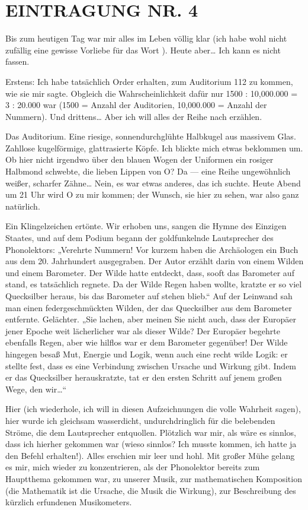 \section{EINTRAGUNG NR. 4}

Bis zum heutigen Tag war mir alles im Leben völlig klar (ich habe
wohl nicht zufällig eine gewisse Vorliebe für das Wort ). Heute
aber\ldots{} Ich kann es nicht fassen.

Erstens: Ich habe tatsächlich Order erhalten, zum Auditorium 112 zu
kommen, wie sie mir sagte. Obgleich die Wahrscheinlichkeit dafür
nur 1500 : 10,000.000 = 3 : 20.000 war (1500 = Anzahl der
Auditorien, 10,000.000 = Anzahl der Nummern). Und drittens\ldots{} Aber
ich will alles der Reihe nach erzählen.

Das Auditorium. Eine
riesige, sonnendurchglühte Halbkugel aus massivem Glas. Zahllose
kugelförmige, glattrasierte Köpfe. Ich blickte mich etwas beklommen
um. Ob hier nicht irgendwo über den blauen Wogen der Uniformen ein
rosiger Halbmond schwebte, die lieben Lippen von O? Da — eine Reihe
ungewöhnlich weißer, scharfer Zähne\ldots{} Nein, es war etwas anderes,
das ich suchte. Heute Abend um 21 Uhr wird O zu mir kommen; der
Wunsch, sie hier zu sehen, war also ganz natürlich.

Ein
Klingelzeichen ertönte. Wir erhoben uns, sangen die Hymne des
Einzigen Staates, und auf dem Podium begann der goldfunkelnde
Lautsprecher des Phonolektors: „Verehrte Nummern! Vor kurzem haben
die Archäologen ein Buch aus dem 20. Jahrhundert ausgegraben. Der
Autor erzählt darin von einem Wilden und einem Barometer. Der Wilde
hatte entdeckt, dass, sooft das Barometer auf  stand, es
tatsächlich regnete. Da der Wilde Regen haben wollte, kratzte er so
viel Quecksilber heraus, bis das Barometer auf  stehen blieb.“
Auf der Leinwand sah man einen federgeschmückten Wilden, der das
Quecksilber aus dem Barometer entfernte. Gelächter. „Sie lachen,
aber meinen Sie nicht auch, dass der Europäer jener Epoche weit
lächerlicher war als dieser Wilde? Der Europäer begehrte ebenfalls
Regen, aber wie hilflos war er dem Barometer gegenüber! Der Wilde
hingegen besaß Mut, Energie und Logik, wenn auch eine recht wilde
Logik: er stellte fest, dass es eine Verbindung zwischen Ursache
und Wirkung gibt. Indem er das Quecksilber herauskratzte, tat er
den ersten Schritt auf jenem großen Wege, den wir\ldots{}“

Hier (ich wiederhole, ich will in diesen Aufzeichnungen die volle
Wahrheit sagen), hier wurde ich gleichsam wasserdicht,
undurchdringlich für die belebenden Ströme, die dem Lautsprecher
entquollen. Plötzlich war mir, als wäre es sinnlos, dass ich
hierher gekommen war (wieso sinnlos? Ich musste kommen, ich hatte
ja den Befehl erhalten!). Alles erschien mir leer und hohl. Mit
großer Mühe gelang es mir, mich wieder zu konzentrieren, als der
Phonolektor bereits zum Hauptthema gekommen war, zu unserer Musik,
zur mathematischen Komposition (die Mathematik ist die Ursache, die
Musik die Wirkung), zur Beschreibung des kürzlich erfundenen
Musikometers. 

